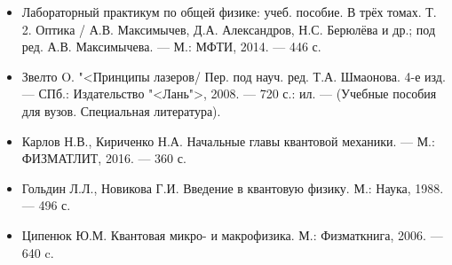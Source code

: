 \documentclass[12pt]{kiarticle}
\begin{document}
\begin{itemize}
	
	\item Лабораторный практикум по общей физике: учеб. пособие. В трёх томах. Т. 2. Оптика / А.В. Максимычев, Д.А. Александров, Н.С. Берюлёва и др.; под ред. А.В. Максимычева. --- М.: МФТИ, 2014. --- 446 с.
	
	\item Звелто O. "<Принципы лазеров/ Пер. под науч. ред. Т.А. Шмаонова. 4-е изд. --- СПб.: Издательство "<Лань">, 2008. --- 720 с.: ил. --- (Учебные пособия для вузов. Специальная литература).
	
	\item Карлов Н.В., Кириченко Н.А. Начальные главы квантовой механики. --- М.: ФИЗМАТЛИТ, 2016. --- 360 с. 
	
	\item Гольдин Л.Л., Новикова Г.И. Введение в квантовую физику. М.: Наука, 1988. --- 496 с. 
	
	\item Ципенюк Ю.М. Квантовая микро- и макрофизика. М.: Физматкнига, 2006. --- 640 c. 
	
\end{itemize}

\end{document}
